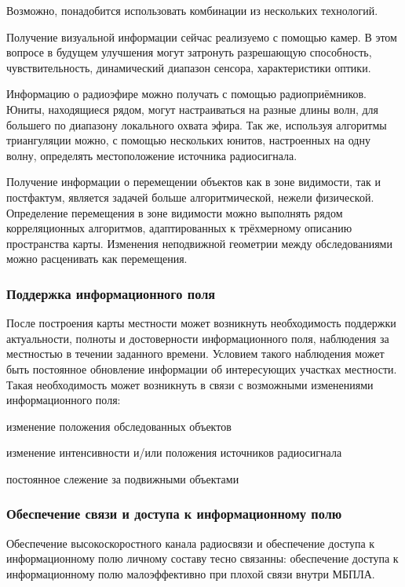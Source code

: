 Возможно, понадобится использовать комбинации из нескольких технологий.

Получение визуальной информации сейчас реализуемо с помощью камер. В этом
вопросе в будущем улучшения могут затронуть разрешающую способность, чувствительность,
динамический диапазон сенсора, характеристики оптики.

Информацию о радиоэфире можно получать с помощью радиоприёмников. Юниты, находящиеся
рядом, могут настраиваться на разные длины волн, для большего по диапазону
локального охвата эфира. Так же, используя алгоритмы триангуляции можно, 
с помощью нескольких юнитов, настроенных на одну волну, определять местоположение
источника радиосигнала.

Получение информации о перемещении объектов как в зоне видимости,
так и постфактум, является задачей больше алгоритмической, нежели физической.
Определение перемещения в зоне видимости можно выполнять рядом корреляционных
алгоритмов, адаптированных к трёхмерному описанию пространства карты.
Изменения неподвижной геометрии между обследованиями можно расценивать как
перемещения.

\subsubsection{Поддержка информационного поля}

После построения карты местности может возникнуть необходимость
поддержки актуальности, полноты и достоверности информационного поля,
наблюдения за местностью в течении заданного времени.
Условием такого наблюдения может быть постоянное обновление информации
об интересующих участках местности. Такая необходимость может возникнуть
в связи с возможными изменениями информационного поля:
\begin{mintemize}
\item изменение положения обследованных объектов 
\item изменение интенсивности и/или положения источников радиосигнала
\item постоянное слежение за подвижными объектами
\end{mintemize}

\subsubsection{Обеспечение связи и доступа к информационному полю}

Обеспечение высокоскоростного канала радиосвязи и обеспечение
доступа к информационному полю личному составу тесно связанны:
обеспечение доступа к информационному полю малоэффективно при
плохой связи внутри МБПЛА.

